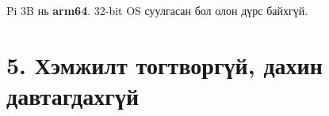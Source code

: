 Pi 3B нь \textbf{arm64}. 32-bit OS суулгасан бол олон дүрс байхгүй.

\begin{Shaded}
\begin{Highlighting}[]
\KeywordTok{|} 
\end{Highlighting}
\end{Shaded}

\hypertarget{ux445ux44dux43cux436ux438ux43bux442-ux442ux43eux433ux442ux432ux43eux440ux433ux4afux439-ux434ux430ux445ux438ux43d-ux434ux430ux432ux442ux430ux433ux434ux430ux445ux433ux4afux439}{%
\section{5. Хэмжилт тогтворгүй, дахин давтагдахгүй}\label{ux445ux44dux43cux436ux438ux43bux442-ux442ux43eux433ux442ux432ux43eux440ux433ux4afux439-ux434ux430ux445ux438ux43d-ux434ux430ux432ux442ux430ux433ux434ux430ux445ux433ux4afux439}}

\begin{Shaded}
\begin{Highlighting}[]
\end{Highlighting}
\end{Shaded}


